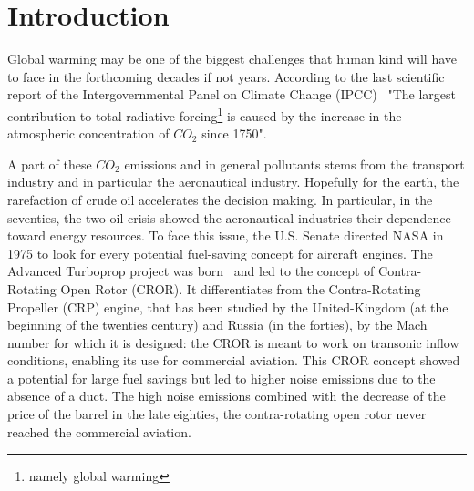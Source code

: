 
\chapter{Introduction}

Global warming may be one of the biggest challenges that human kind
will have to face in the forthcoming decades if not years.
According to the last scientific
report of the Intergovernmental Panel on Climate Change 
(IPCC)~\cite{IPCC2013}
"The largest contribution to total radiative 
forcing\footnote{namely global warming} 
is caused by the increase in the atmospheric 
concentration of $CO_2$ since 1750".

A part of these $CO_2$ emissions and in general pollutants stems from the
transport industry and in particular the
aeronautical industry. 
Hopefully for the earth,
the rarefaction of crude oil accelerates the decision making.
In particular, in the seventies, the two oil crisis showed the aeronautical 
industries their dependence toward energy resources. 
To face this issue, the U.S. Senate directed NASA in 1975
to look for every potential fuel-saving concept for aircraft
engines. The Advanced Turboprop
project was born~\cite{Hager1988} and led to the
concept of Contra-Rotating Open Rotor (CROR). It differentiates
from the Contra-Rotating Propeller (CRP) engine, that has been
studied by the United-Kingdom (at the beginning of the twenties century) 
and Russia (in the forties), by the Mach number for which it is designed:
the CROR is meant to work on transonic inflow conditions,
enabling its use for commercial aviation.
This CROR concept showed a potential for large fuel savings
but led to higher noise emissions due to the absence of
a duct. The high noise emissions 
combined with the decrease of the price of the
barrel in the late eighties, the contra-rotating open rotor 
never reached the commercial aviation.

